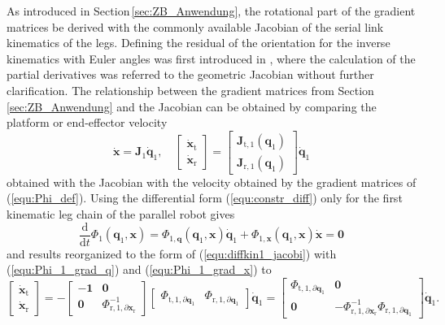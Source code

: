 \documentclass[robotics,article,accept,moreauthors,pdftex]{Definitions/mdpi}
\newcommand{\bm}[1]{\boldsymbol{#1}}
\let\Phi\varPhi
\begin{document}
As introduced in Section\,\ref{sec:ZB_Anwendung}, the rotational part of the gradient matrices  be derived with the commonly available Jacobian of the serial link kinematics of the legs.
Defining the residual of the orientation for the inverse kinematics with Euler angles was first introduced in \cite{GoldenbergBenFen1985}, where the calculation of the partial derivatives was referred to the geometric Jacobian without further clarification.
The relationship between the gradient matrices from Section\,\ref{sec:ZB_Anwendung} and the Jacobian can be obtained by comparing the platform or end-effector velocity 
%
\begin{equation}
\dot{\bm{x}} = \bm{J}_1 \dot{\bm{q}}_1,
\quad
\begin{bmatrix}
\dot{\bm{x}}_\mathrm{t}\\
\dot{\bm{x}}_\mathrm{r}
\end{bmatrix}
 = 
\begin{bmatrix}
 \bm{J}_{\mathrm{t},1}(\bm{q}_1)\\
 \bm{J}_{\mathrm{r},1}(\bm{q}_1) 
\end{bmatrix}
\dot{\bm{q}}_1
\label{equ:diffkin1_jacobi}
\end{equation}
%
obtained with the Jacobian with the velocity obtained by the gradient matrices of (\ref{equ:Phi_def}).
Using the differential form (\ref{equ:constr_diff}) only for the first kinematic leg chain of the parallel robot gives
%
\begin{equation}
\frac{\mathrm{d}}{\mathrm{d}t} \bm{\Phi}_1(\bm{q}_1,\bm{x})
=
\bm{\Phi}_{1,\bm{q}}(\bm{q}_1,\bm{x}) \dot{\bm{q}}_1 + \bm{\Phi}_{1,\bm{x}}(\bm{q}_1,\bm{x}) \dot{\bm{x}} 
=
\bm{0}
\label{equ:constr_diff1}
\end{equation}
%
and results reorganized to the form of (\ref{equ:diffkin1_jacobi}) with (\ref{equ:Phi_1_grad_q}) and (\ref{equ:Phi_1_grad_x}) to
%
\begin{equation}
\begin{bmatrix}
\dot{\bm{x}}_\mathrm{t}\\
\dot{\bm{x}}_\mathrm{r}
\end{bmatrix}
=
-
\begin{bmatrix}
-\bm{1} & \bm{0} \\
\bm{0} & \bm{\Phi}_{\mathrm{r},1,\partial\bm{x}_\mathrm{r}}^{-1}
\end{bmatrix}
\begin{bmatrix}
\bm{\Phi}_{\mathrm{t},1,\partial\bm{q}_1}
&
\bm{\Phi}_{\mathrm{r},1,\partial\bm{q}_1}
\end{bmatrix}
\dot{\bm{q}}_1
=
\begin{bmatrix}
\bm{\Phi}_{\mathrm{t},1,\partial\bm{q}_1} & \bm{0} \\
\bm{0} & -\bm{\Phi}_{\mathrm{r},1,\partial\bm{x}_\mathrm{r}}^{-1} \bm{\Phi}_{\mathrm{r},1,\partial\bm{q}_1}
\end{bmatrix}
\dot{\bm{q}}_1.
\label{equ:diffkin1_gradmat}
\end{equation}
\end{document}
